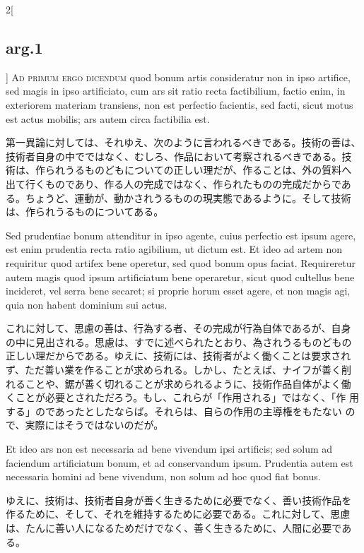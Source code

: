 \documentclass[paper=a4paper,fontsize=10pt,jafontsize=9pt,titlepage]{jlreq}
\begin{document}
\begin{paracol}{2}[\subsection{arg.1}]
{\scshape Ad primum ergo dicendum} quod bonum artis consideratur non
in ipso artifice, sed magis in ipso artificiato, cum ars sit ratio
recta factibilium, factio enim, in exteriorem materiam transiens, non
est perfectio facientis, sed facti, sicut motus est actus mobilis; ars
autem circa factibilia est.

\switchcolumn

第一異論に対しては、それゆえ、次のように言われるべきである。技術の善は、
技術者自身の中でではなく、むしろ、作品において考察されるべきである。技
術は、作られうるものどもについての正しい理だが、作ることは、外の質料へ
出て行くものであり、作る人の完成ではなく、作られたものの完成だからであ
る。ちょうど、運動が、動かされうるものの現実態であるように。そして技術
は、作られうるものについてある。

\switchcolumn*

Sed prudentiae bonum attenditur in ipso agente, cuius perfectio est
ipsum agere, est enim prudentia recta ratio agibilium, ut dictum
est. Et ideo ad artem non requiritur quod artifex bene operetur, sed
quod bonum opus faciat. Requireretur autem magis quod ipsum
artificiatum bene operaretur, sicut quod cultellus bene incideret, vel
serra bene secaret; si proprie horum esset agere, et non magis agi,
quia non habent dominium sui actus.

\switchcolumn

これに対して、思慮の善は、行為する者、その完成が行為自体であるが、自身
の中に見出される。思慮は、すでに述べられたとおり、為されうるものどもの
正しい理だからである。ゆえに、技術には、技術者がよく働くことは要求され
ず、ただ善い業を作ることが求められる。しかし、たとえば、ナイフが善く削
れることや、鋸が善く切れることが求められるように、技術作品自体がよく働
くことが必要とされただろう。もし、これらが「作用される」ではなく、「作
用する」のであったとしたならば。それらは、自らの作用の主導権をもたない
ので、実際にはそうではないのだが。

\switchcolumn*

Et ideo ars non est necessaria ad bene vivendum ipsi artificis; sed
solum ad faciendum artificiatum bonum, et ad conservandum ipsum.
Prudentia autem est necessaria homini ad bene vivendum, non solum ad
hoc quod fiat bonus.

\switchcolumn

ゆえに、技術は、技術者自身が善く生きるために必要でなく、善い技術作品を
作るために、そして、それを維持するために必要である。これに対して、思慮
は、たんに善い人になるためだけでなく、善く生きるために、人間に必要であ
る。


\end{paracol}
\end{document}
